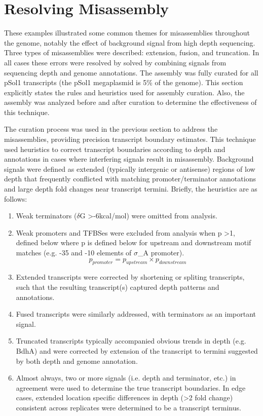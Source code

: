
\section{Resolving Misassembly}

These examples illustrated some common themes for misassemblies throughout the genome, notably the effect of background signal from high depth sequencing. Three types of misassemblies were described: extension, fusion, and truncation. In all cases these errors were resolved by solved by combining signals from sequencing depth and genome annotations. The assembly was fully curated for all pSol1 transcripts (the pSol1 megaplasmid is 5\% of the genome). This section explicitly states the rules and heuristics used for assembly curation. Also, the assembly was analyzed before and after curation to determine the effectiveness of this technique. 

The curation process was used in the previous section to address the misassemblies, providing precision transcript boundary estimates. This technique used heuristics to correct transcript boundaries according to depth and annotations in cases where interfering signals result in misassembly. Background signals were defined as extended (typically intergenic or antisense) regions of low depth that frequently conflicted with matching promoter/terminator annotations and large depth fold changes near transcript termini. Briefly, the heuristics are as follows:

\begin{enumerate}
\item Weak terminators ($\delta$G \textgreater -6kcal/mol) were omitted from analysis.
\item Weak promoters and TFBSes were excluded from analysis when p \textgreater 1, defined below where p is defined below for upstream and downstream motif matches (e.g. -35 and -10 elements of $\sigma$_{A} promoter). 
\[ p_{promoter} = p_{upstream} \times p_{downstream} \]
\item Extended transcripts were corrected by shortening or spliting transcripts, such that the resulting transcript(s) captured depth patterns and annotations.
\item Fused transcripts were similarly addressed, with terminators as an important signal.
\item Truncated transcripts typically accompanied obvious trends in depth (e.g. BdhA) and were corrected by extension of the transcript to termini suggested by both depth and genome annotation.
\item Almost always, two or more signals (i.e. depth and terminator, etc.) in agreement were used to determine the true transcript boundaries. In edge cases, extended location specific differences in depth (\textgreater 2 fold change) consistent across replicates were determined to be a transcript terminus.
\end{enumerate}

